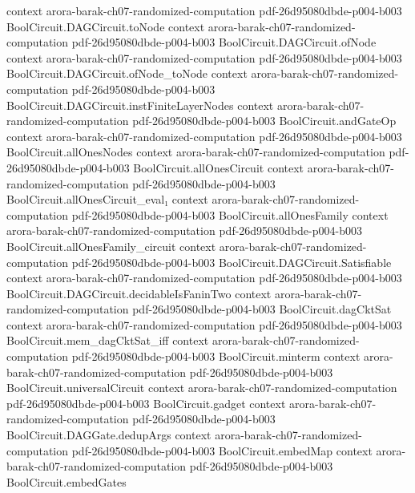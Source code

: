 \begin{theorem}
  {context}
  {arora-barak-ch07-randomized-computation}
  {pdf-26d95080dbde-p004-b003}
\proofstep
  {BoolCircuit.DAGCircuit.toNode}
  {context}
  {arora-barak-ch07-randomized-computation}
  {pdf-26d95080dbde-p004-b003}
\proofstep
  {BoolCircuit.DAGCircuit.ofNode}
  {context}
  {arora-barak-ch07-randomized-computation}
  {pdf-26d95080dbde-p004-b003}
\proofstep
  {BoolCircuit.DAGCircuit.ofNode_toNode}
  {context}
  {arora-barak-ch07-randomized-computation}
  {pdf-26d95080dbde-p004-b003}
\proofstep
  {BoolCircuit.DAGCircuit.instFiniteLayerNodes}
  {context}
  {arora-barak-ch07-randomized-computation}
  {pdf-26d95080dbde-p004-b003}
\proofstep
  {BoolCircuit.andGateOp}
  {context}
  {arora-barak-ch07-randomized-computation}
  {pdf-26d95080dbde-p004-b003}
\proofstep
  {BoolCircuit.allOnesNodes}
  {context}
  {arora-barak-ch07-randomized-computation}
  {pdf-26d95080dbde-p004-b003}
\proofstep
  {BoolCircuit.allOnesCircuit}
  {context}
  {arora-barak-ch07-randomized-computation}
  {pdf-26d95080dbde-p004-b003}
\proofstep
  {BoolCircuit.allOnesCircuit_eval₁}
  {context}
  {arora-barak-ch07-randomized-computation}
  {pdf-26d95080dbde-p004-b003}
\proofstep
  {BoolCircuit.allOnesFamily}
  {context}
  {arora-barak-ch07-randomized-computation}
  {pdf-26d95080dbde-p004-b003}
\proofstep
  {BoolCircuit.allOnesFamily_circuit}
  {context}
  {arora-barak-ch07-randomized-computation}
  {pdf-26d95080dbde-p004-b003}
\proofstep
  {BoolCircuit.DAGCircuit.Satisfiable}
  {context}
  {arora-barak-ch07-randomized-computation}
  {pdf-26d95080dbde-p004-b003}
\proofstep
  {BoolCircuit.DAGCircuit.decidableIsFaninTwo}
  {context}
  {arora-barak-ch07-randomized-computation}
  {pdf-26d95080dbde-p004-b003}
\proofstep
  {BoolCircuit.dagCktSat}
  {context}
  {arora-barak-ch07-randomized-computation}
  {pdf-26d95080dbde-p004-b003}
\proofstep
  {BoolCircuit.mem_dagCktSat_iff}
  {context}
  {arora-barak-ch07-randomized-computation}
  {pdf-26d95080dbde-p004-b003}
\proofstep
  {BoolCircuit.minterm}
  {context}
  {arora-barak-ch07-randomized-computation}
  {pdf-26d95080dbde-p004-b003}
\proofstep
  {BoolCircuit.universalCircuit}
  {context}
  {arora-barak-ch07-randomized-computation}
  {pdf-26d95080dbde-p004-b003}
\proofstep
  {BoolCircuit.gadget}
  {context}
  {arora-barak-ch07-randomized-computation}
  {pdf-26d95080dbde-p004-b003}
\proofstep
  {BoolCircuit.DAGGate.dedupArgs}
  {context}
  {arora-barak-ch07-randomized-computation}
  {pdf-26d95080dbde-p004-b003}
\proofstep
  {BoolCircuit.embedMap}
  {context}
  {arora-barak-ch07-randomized-computation}
  {pdf-26d95080dbde-p004-b003}
\proofstep
  {BoolCircuit.embedGates}

\end{theorem}
